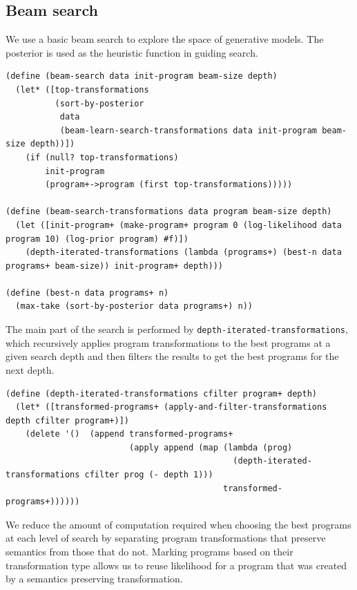 \documentclass[a4paper,10pt]{article}
\begin{document}
\subsection{Beam search}
We use a basic beam search to explore the space of generative models.  The posterior is used as the heuristic function in guiding search.
\begin{lstlisting}[frame=trBL]
(define (beam-search data init-program beam-size depth)
  (let* ([top-transformations 
          (sort-by-posterior
           data 
           (beam-learn-search-transformations data init-program beam-size depth))])
    (if (null? top-transformations)
        init-program
        (program+->program (first top-transformations)))))

(define (beam-search-transformations data program beam-size depth)
  (let ([init-program+ (make-program+ program 0 (log-likelihood data program 10) (log-prior program) #f)])
    (depth-iterated-transformations (lambda (programs+) (best-n data programs+ beam-size)) init-program+ depth)))

(define (best-n data programs+ n)
  (max-take (sort-by-posterior data programs+) n))
\end{lstlisting}
The main part of the search is performed by \texttt{depth-iterated-transformations}, which recursively applies program transformations to the best programs at a given search depth and then filters the results to get the best programs for the next depth.
\begin{lstlisting}[frame=trBL]
(define (depth-iterated-transformations cfilter program+ depth)
  (let* ([transformed-programs+ (apply-and-filter-transformations depth cfilter program+)])
    (delete '()  (append transformed-programs+
                         (apply append (map (lambda (prog) 
                                              (depth-iterated-transformations cfilter prog (- depth 1))) 
                                            transformed-programs+))))))
\end{lstlisting}
We reduce the amount of computation required when choosing the best programs at each level of search by separating program transformations that preserve semantics from those that do not.  Marking programs based on their transformation type allows us to reuse likelihood for a program that was created by a semantics preserving transformation.
\end{document}
